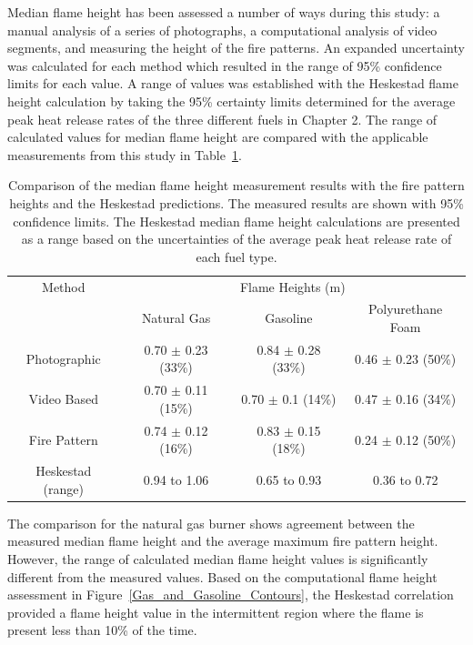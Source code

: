 \documentclass[twoside]{uocthesis}
\begin{document}
{Median flame height has been assessed a number of ways during this study: a manual analysis of a series of photographs, a computational analysis of video segments, and measuring the height of the fire patterns.  An expanded uncertainty was calculated for each method which resulted in the range of 95\% confidence limits for each value.  A range of values was established with the Heskestad flame height calculation by taking the 95\% certainty limits determined for the average peak heat release rates of the three different fuels in Chapter 2.  The range of calculated values for median flame height are compared with the applicable measurements from this study in Table~\ref{tab:Comparing_Flame_Heights}.

\begin{table}
\centering
\footnotesize
\begin{tabular}{|c|c|c|c|}
\hline
Method          &   \multicolumn{3}{|c|}{Flame Heights (m)} \\ \cline{2-4}
                &       Natural Gas	            &   Gasoline	            & Polyurethane Foam \\ \hline 
Photographic    &       0.70 $\pm$ 0.23 (33\%)   &	0.84 $\pm$ 0.28 (33\%) 	& 0.46 $\pm$ 0.23 (50\%)   \\
Video Based     &   	0.70 $\pm$ 0.11 (15\%)   &	0.70 $\pm$ 0.1 (14\%) 	& 0.47 $\pm$ 0.16 (34\%)   \\
Fire Pattern    &   	0.74 $\pm$ 0.12 (16\%)   &	0.83 $\pm$ 0.15 (18\%) 	& 0.24 $\pm$ 0.12 (50\%)   \\
Heskestad (range)  &   	0.94 to 1.06		    &	0.65 to 0.93        	& 0.36 to 0.72   \\
\hline
\end{tabular}
 \caption[Comparison of the median flame height measurement results with the fire pattern heights and the Heskestad predictions]{Comparison of the median flame height measurement results with the fire pattern heights and the Heskestad predictions. The measured results are shown with 95\% confidence limits.  The Heskestad median flame height calculations are presented as a range based on the uncertainties of the average peak heat release rate of each fuel type.} 
 \label{tab:Comparing_Flame_Heights}
\end{table}

 The comparison for the natural gas burner shows agreement between the measured median flame height and the average maximum fire pattern height. However, the range of calculated median flame height values is significantly different from the measured values. Based on the computational flame height assessment in Figure~\ref{Gas_and_Gasoline_Contours}, the Heskestad correlation provided a flame height value in the intermittent region where the flame is present less than 10\% of the time.     

}
\end{document}

